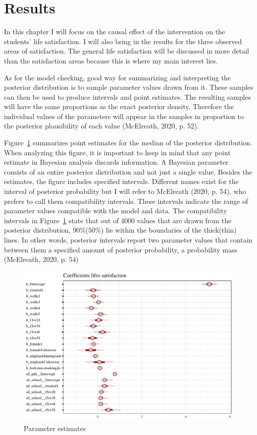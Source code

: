 \documentclass[a4, 12pt]{article}
\begin{document}
\hypertarget{results}{%
\section{Results}\label{results}}

\label{ch:results}
In this chapter I will focus on the causal effect of the intervention on the students' life satisfaction. I will also bring in the results for the three observed areas of satisfaction. The general life satisfaction will be discussed in more detail than the satisfaction areas because this is where my main interest lies.

As for the model checking, good way for summarizing and interpreting the posterior distribution is to sample parameter values drawn from it. These samples can then be used to produce intervals and point estimates. The resulting samples will have the same proportions as the exact posterior density. Therefore the individual values of the parameters will appear in the samples in proportion to the posterior plausibility of each value (McElreath, 2020, p. 52).

Figure~\ref{fig:m1-coef} summarizes point estimates for the median of the posterior distribution. When analyzing this figure, it is important to keep in mind that any point estimate in Bayesian analysis discards information. A Bayesian parameter consists of an entire posterior distribution and not just a single value. Besides the estimates, the figure includes specified intervals. Different names exist for the interval of posterior probability but I will refer to McElreath (2020, p. 54), who prefers to call them compatibility intervals. These intervals indicate the range of parameter values compatible with the model and data.
The compatibility intervals in Figure~\ref{fig:m1-coef} state that out of 4000 values that are drawn from the posterior distribution, 90\%(50\%) lie within the boundaries of the thick(thin) lines. In other words, posterior intervals report two parameter values that contain between them a specified amount of posterior probability, a probability mass (McElreath, 2020, p. 54)

\begin{figure}[H]

{\centering \includegraphics[width=0.8\linewidth,]{../figures/m1_coef} 

}

\caption{Parameter estimates}\label{fig:m1-coef}
\end{figure}
\end{document}
